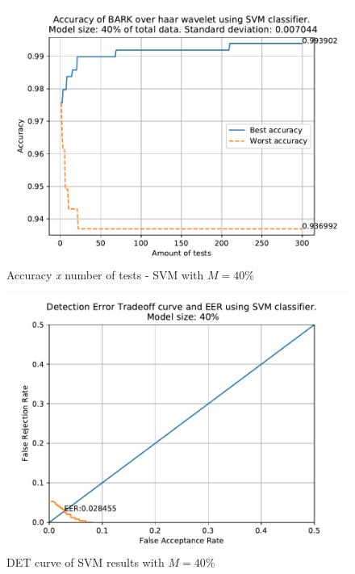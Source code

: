 		\begin{figure}[H]
			\centering
			\includegraphics[scale=.8]{images/results/confusionMatrices/classifier_SVM_40.pdf}
			\caption{Accuracy \textit{x} number of tests - SVM with $M=40\%$}
			\label{fig:classifiersvm40}
		\end{figure}
		\begin{figure}[H]
			\centering
			\includegraphics[scale=.8]{images/results/det/DET_for_classifier_SVM_40.pdf}
			\caption{DET curve of SVM results with $M=40\%$}
			\label{fig:detsvm40}
		\end{figure}
